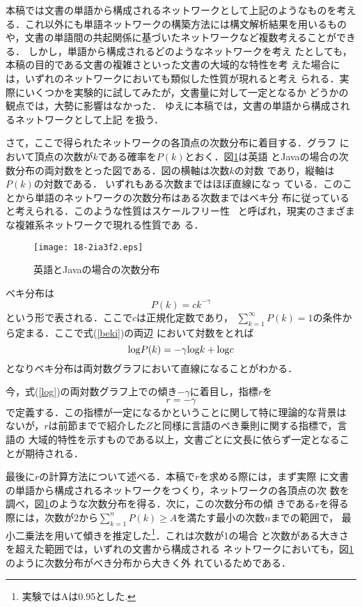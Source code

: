 \documentclass[japanese]{jnlp_JS2.0}
\begin{document}
本稿では文書の単語から構成されるネットワークとして上記のようなものを考え
る．これ以外にも単語ネットワークの構築方法には構文解析結果を用いるもの
や，文書の単語間の共起関係に基づいたネットワークなど複数考えることができる．
しかし，単語から構成されるどのようなネットワークを考え
たとしても，本稿の目的である文書の複雑さといった文書の大域的な特性を考
えた場合には，いずれのネットワークにおいても類似した性質が現れると考え
られる．実際にいくつかを実験的に試してみたが，文書量に対して一定となるか
どうかの観点では，大勢に影響はなかった．
ゆえに本稿では，文書の単語から構成されるネットワークとして上記
を扱う．
   
さて，ここで得られたネットワークの各頂点の次数分布に着目する．グラフ
において頂点の次数が$k$である確率を$P(k)$とおく．図\ref{fig:deg}は英語
とJavaの場合の次数分布の両対数をとった図である．図の横軸は次数$k$の対数
であり，縦軸は$P(k)$の対数である． いずれもある次数まではほぼ直線になっ
ている．このことから単語のネットワークの次数分布はある次数まではベキ分
布に従っていると考えられる．このような性質はスケールフリー性
~\cite{Barabasi}と呼ばれ，現実のさまざまな複雑系ネットワークで現れる性質であ
る．

\begin{figure}[b]
 \begin{center}
  \texttt{[image: 18-2ia3f2.eps]}
 \end{center}
 \caption{英語とJavaの場合の次数分布}
 \label{fig:deg}
\end{figure}

ベキ分布は
\begin{equation}
P(k)=ck^{-\gamma} 
\label{beki}
\end{equation}
という形で表される．ここで$c$は正規化定数であり，
$\sum_{k=1}^{\infty}P(k)=1 $の条件から定まる．ここで式(\ref{beki})の両辺
において対数をとれば
\begin{equation}
{\rm log}P(k)=-\gamma{\rm log}k+{\rm log}c 
\label{log} 
\end{equation}
となりベキ分布は両対数グラフにおいて直線になることがわかる．

 今，式(\ref{log})の両対数グラフ上での傾き$-\gamma$に着目し，指標$r$を
\begin{equation}
r=-\gamma        
\label {eqr}
\end{equation}
で定義する．この指標が一定になるかということに関して特に理論的な背景は
ないが，$r$は前節までで紹介した$Z$と同様に言語のべき乗則に関する指標で，言語の
大域的特性を示すものである以上，文書ごとに文長に依らず一定となることが期待される．

最後に$r$の計算方法について述べる．本稿で$r$を求める際には，まず実際
に文書の単語から構成されるネットワークをつくり，ネットワークの各頂点の次
数を調べ，図\ref{fig:deg}のような次数分布を得る．次に，この次数分布の傾
きである$r$を得る際には，次数が2から$\sum_{k=1}^{n}P(k)\geq
A$を満たす最小の次数$n$までの範囲で，
最小二乗法を用いて傾きを推定した\footnote{実験ではAは0.95とした.}．これは次数が1の場合
と次数がある大きさを超えた範囲では，いずれの文書から構成される
ネットワークにおいても，図\ref{fig:deg}のように次数分布がべき分布から大きく外
れているためである．
\end{document}
